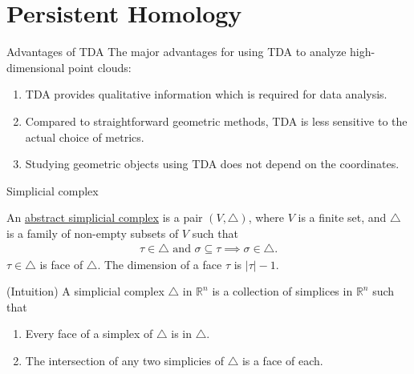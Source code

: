 \documentclass[xcolor={dvipsnames,svgnames}]{beamer}
\begin{document}
\section{Persistent Homology}
\begin{frame}{Advantages of TDA}
    The major advantages for using TDA to analyze high-dimensional point clouds:
\begin{enumerate}
	\item TDA provides qualitative information which is required for data analysis.
	
	\item Compared to straightforward geometric methods, TDA is less sensitive to the actual choice of metrics. 
	
	\item Studying geometric objects using TDA does not depend on the coordinates. 
	\end{enumerate}
\end{frame}

\begin{frame}{Simplicial complex}
    
\begin{defn}
	An \underline{abstract simplicial complex} is a pair $(V, \triangle)$, where $V$ is a finite set, and $\triangle$ is a family of non-empty subsets of $V$ such that 
	\begin{align}
	    \tau \in \triangle \text{ and }\sigma \subseteq \tau \implies \sigma \in \triangle.
	\end{align}
	$\tau \in \triangle $ is face of $\triangle$. The dimension of a face $\tau$ is $|\tau| - 1.$
	\end{defn}

	(Intuition) A simplicial complex $\triangle$ in $\mathbb{R}^n$ is a collection of simplices in $\mathbb{R}^n$ such that
	\begin{enumerate}
	    \item Every face of a simplex of $\triangle$ is in $\triangle$.
	    \item The intersection of any two simplicies of $\triangle$ is a face of each. 
	\end{enumerate}
\end{frame}
\end{document}

